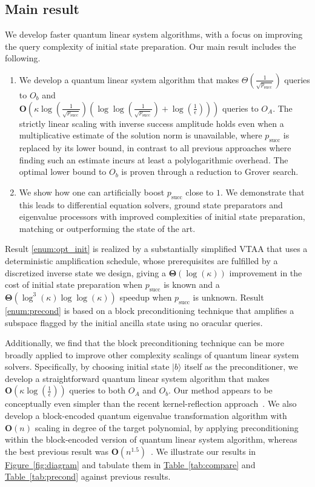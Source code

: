 \documentclass[letterpaper,onecolumn,11pt,accepted=2026-02-14]{quantumarticle}
\theoremstyle{remark}
\theoremstyle{plain}
\newcommand{\fig}[1]{\hyperref[fig:#1]{Figure~\ref*{fig:#1}}}
\newcommand{\tab}[1]{\hyperref[tab:#1]{Table~\ref*{tab:#1}}}
\newcommand{\ket}[1]{|#1\rangle}
\begin{document}
\subsection{Main result}
\label{sec:intro_result}
We develop faster quantum linear system algorithms, with a focus on improving the query complexity of initial state preparation. Our main result includes the following.
\begin{enumerate}[label=(\roman*)]
    \item \label{enum:opt_init} We develop a quantum linear system algorithm that makes $\Theta\left(\frac{1}{\sqrt{p_{\text{succ}}}}\right)$ queries to $O_b$ and\\ $\mathbf{O}\left(\kappa\log\left(\frac{1}{\sqrt{p_{\text{succ}}}}\right)\left(\log\log\left(\frac{1}{\sqrt{p_{\text{succ}}}}\right)+\log\left(\frac{1}{\epsilon}\right)\right)\right)$ queries to $O_A$. The strictly linear scaling with inverse success amplitude holds even when a multiplicative estimate of the solution norm is unavailable, where $p_{\text{succ}}$ is replaced by its lower bound, in contrast to all previous approaches where finding such an estimate incurs at least a polylogarithmic overhead. The optimal lower bound to $O_b$ is proven through a reduction to Grover search.
    \item \label{enum:precond} We show how one can artificially boost $p_{\text{succ}}$ close to $1$. We demonstrate that this leads to differential equation solvers, ground state preparators and eigenvalue processors with improved complexities of initial state preparation, matching or outperforming the state of the art.
\end{enumerate}
Result \ref{enum:opt_init} is realized by a substantially simplified VTAA that uses a deterministic amplification schedule, whose prerequisites are fulfilled by a discretized inverse state we design, giving a  $\mathbf{\Theta}\left(\log(\kappa)\right)$ improvement in the cost of initial state preparation when $p_{\text{succ}}$ is known and a $\mathbf{\Theta}\left(\log^3(\kappa)\log\log(\kappa)\right)$ speedup when $p_{\text{succ}}$ is unknown.
Result \ref{enum:precond} is based on a block preconditioning technique that amplifies a subspace flagged by the initial ancilla state using no oracular queries.

Additionally, we find that the block preconditioning technique can be more broadly applied to improve other complexity scalings of quantum linear system solvers.
Specifically, by choosing initial state $\ket{b}$ itself as the preconditioner, we develop a straightforward quantum linear system algorithm that makes $\mathbf{O}\left(\kappa\log\left(\frac{1}{\epsilon}\right)\right)$ queries to both $O_A$ and $O_b$. Our method appears to be conceptually even simpler than the recent kernel-reflection approach~\cite{Dalzell2024shortcut}.
We also develop a block-encoded quantum eigenvalue transformation algorithm with $\mathbf{O}(n)$ scaling in degree of the target polynomial, by applying preconditioning within the block-encoded version of quantum linear system algorithm, whereas the best previous result was $\mathbf{O}(n^{1.5})$~\cite[Section 5.2]{QEVP}.
We illustrate our results in \fig{diagram} and tabulate them in \tab{compare} and \tab{precond} against previous results.
\end{document}
